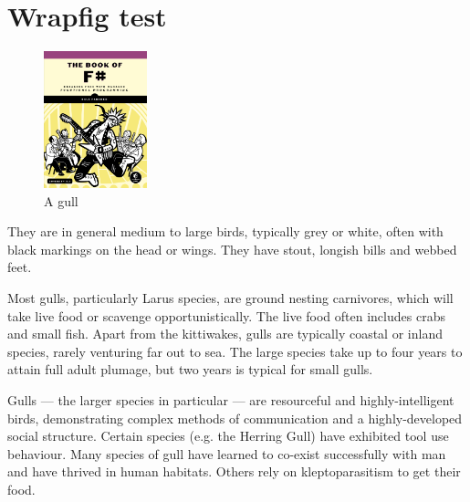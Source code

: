 \documentclass[a4paper,12pt]{article}
\begin{document}
\section*{Wrapfig test}
\begin{figure}
  \vspace{-20pt}
  \begin{center}
    \includegraphics[width=3.0cm]{../pic/cover.png}
  \end{center}
  \vspace{-20pt}
  \caption{A gull}
  \vspace{-10pt}
\end{figure}
They are in general medium to large birds, typically grey or white,
often with black markings on the head or wings. They have stout,
longish bills and webbed feet.

Most gulls, particularly Larus species, are ground nesting carnivores,
which will take live food or scavenge opportunistically. The live food
often includes crabs and small fish. Apart from the kittiwakes, gulls
are typically coastal or inland species, rarely venturing far out to sea.
The large species take up to four years to attain full adult plumage,
but two years is typical for small gulls.
\begin{sloppy}
Gulls — the larger species in particular — are resourceful and
highly-intelligent birds, demonstrating complex methods of communication
and a highly-developed social structure. Certain species (e.g. the
Herring Gull) have exhibited tool use behaviour. Many species of gull
have learned to co-exist successfully with man and have thrived in
human habitats. Others rely on kleptoparasitism to get their food.
\end{sloppy}
\end{document}
